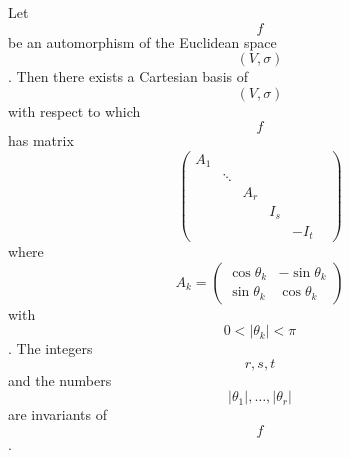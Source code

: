 Let $$f$$ be an automorphism of the Euclidean space $$(V, \sigma)$$. Then there exists a Cartesian basis of $$(V, \sigma)$$ with respect to which $$f$$ has matrix
$$\begin{pmatrix} A_1 & & & & & \\ & \ddots & & & & \\ & & A_r & & & \\ & & & I_s & & \\ & & & & -I_t \end{pmatrix}$$
where $$A_k = \begin{pmatrix} \cos \theta_k & -\sin \theta_k \\ \sin \theta_k & \cos \theta_k \end{pmatrix}$$ with $$0 < |\theta_k| < \pi$$. The integers $$r, s, t$$ and the numbers $$|\theta_1|, \ldots, |\theta_r|$$ are invariants of $$f$$.
